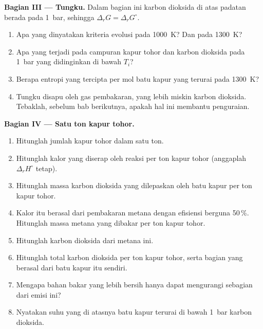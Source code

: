 \begin{problem}
\medskip
\noindent\textbf{Bagian III --- Tungku.}
Dalam bagian ini karbon dioksida di atas padatan berada pada \qty{1}{bar},
sehingga $\Delta_r G = \Delta_r G^\circ$.
\begin{enumerate}[resume]
  \item Apa yang dinyatakan kriteria evolusi pada \qty{1000}{K}? Dan pada
        \qty{1300}{K}?
  \item Apa yang terjadi pada campuran kapur tohor dan karbon dioksida
        pada \qty{1}{bar} yang didinginkan di bawah $T_i$?
  \item Berapa entropi yang tercipta per mol batu kapur yang terurai pada
        \qty{1300}{K}?
  \item Tungku disapu oleh gas pembakaran, yang lebih miskin karbon
        dioksida. Tebaklah, sebelum bab berikutnya, apakah hal ini
        membantu penguraian.
\end{enumerate}

\medskip
\noindent\textbf{Bagian IV --- Satu ton kapur tohor.}
\begin{enumerate}[resume]
  \item Hitunglah jumlah kapur tohor dalam satu ton.
  \item Hitunglah kalor yang diserap oleh reaksi per ton kapur tohor
        (anggaplah $\Delta_r H^\circ$ tetap).
  \item Hitunglah massa karbon dioksida yang dilepaskan oleh batu kapur
        per ton kapur tohor.
  \item Kalor itu berasal dari pembakaran metana dengan efisiensi berguna
        50\,\%. Hitunglah massa metana yang dibakar per ton kapur tohor.
  \item Hitunglah karbon dioksida dari metana ini.
  \item Hitunglah total karbon dioksida per ton kapur tohor, serta bagian
        yang berasal dari batu kapur itu sendiri.
  \item Mengapa bahan bakar yang lebih bersih hanya dapat mengurangi
        sebagian dari emisi ini?
  \item Nyatakan suhu yang di atasnya batu kapur terurai di bawah
        \qty{1}{bar} karbon dioksida.
\end{enumerate}
\end{problem}
